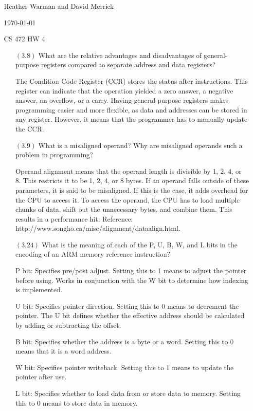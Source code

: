 \documentclass[letterpaper,10pt,titlepage]{article}
\def\name{Heather Warman and David Merrick}
\begin{document}
\hfill \name

\hfill \today

\hfill CS 472 HW 4

\begin{enumerate}
\item[$(3.8)$] What are the relative advantages and disadvantages of general-purpose registers compared to separate address and data registers?

The Condition Code Register (CCR) stores the status after instructions. This register can indicate that the operation yielded a zero answer, a negative answer, an overflow, or a carry. Having general-purpose registers makes programming easier and more flexible, as  data and addresses can be stored in any register. However, it means that the programmer has to manually update the CCR. 


\item[$(3.9)$] What is a misaligned operand? Why are misaligned operands such a problem in programming?

Operand alignment means that the operand length is divisible by 1, 2, 4, or 8. This restricts it to be 1, 2, 4, or 8 bytes. If an operand falls outside of these parameters, it is said to be misaligned. If this is the case, it adds overhead for the CPU to access it. To access the operand, the CPU has to load multiple chunks of data, shift out the unnecessary bytes, and combine them. This results in a performance hit. Reference: http://www.songho.ca/misc/alignment/dataalign.html.


\item[$(3.24)$] What is the meaning of each of the P, U, B, W, and L bits in the encoding of an ARM memory reference instruction?

P bit: Specifies pre/post adjust. Setting this to 1 means to adjust the pointer before using. Works in conjunction with the W bit to determine how indexing is implemented.

U bit: Specifies pointer direction. Setting this to 0 means to decrement the pointer. The U bit defines whether the effective address should be calculated by adding or subtracting the offset.

B bit: Specifies whether the address is a byte or a word. Setting this to 0 means that it is a word address.

W bit: Specifies pointer writeback. Setting this to 1 means to update the pointer after use.

L bit: Specifies whether to load data from or store data to memory. Setting this to 0 means to store data in memory.



\end{enumerate}
\end{document}
